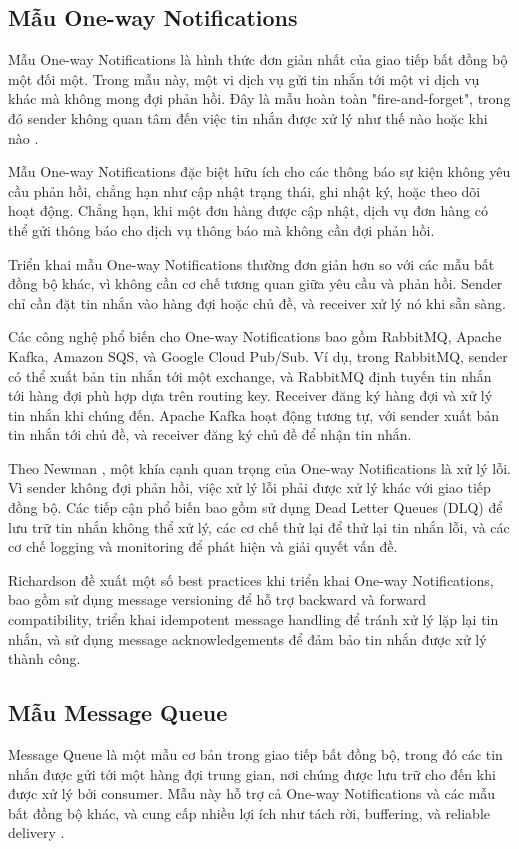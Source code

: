 \subsection{Mẫu One-way Notifications}
Mẫu One-way Notifications là hình thức đơn giản nhất của giao tiếp bất đồng bộ một đối một. Trong mẫu này, một vi dịch vụ gửi tin nhắn tới một vi dịch vụ khác mà không mong đợi phản hồi. Đây là mẫu hoàn toàn "fire-and-forget", trong đó sender không quan tâm đến việc tin nhắn được xử lý như thế nào hoặc khi nào \cite{hohpe2004}.

Mẫu One-way Notifications đặc biệt hữu ích cho các thông báo sự kiện không yêu cầu phản hồi, chẳng hạn như cập nhật trạng thái, ghi nhật ký, hoặc theo dõi hoạt động. Chẳng hạn, khi một đơn hàng được cập nhật, dịch vụ đơn hàng có thể gửi thông báo cho dịch vụ thông báo mà không cần đợi phản hồi.

Triển khai mẫu One-way Notifications thường đơn giản hơn so với các mẫu bất đồng bộ khác, vì không cần cơ chế tương quan giữa yêu cầu và phản hồi. Sender chỉ cần đặt tin nhắn vào hàng đợi hoặc chủ đề, và receiver xử lý nó khi sẵn sàng.

Các công nghệ phổ biến cho One-way Notifications bao gồm RabbitMQ, Apache Kafka, Amazon SQS, và Google Cloud Pub/Sub. Ví dụ, trong RabbitMQ, sender có thể xuất bản tin nhắn tới một exchange, và RabbitMQ định tuyến tin nhắn tới hàng đợi phù hợp dựa trên routing key. Receiver đăng ký hàng đợi và xử lý tin nhắn khi chúng đến. Apache Kafka hoạt động tương tự, với sender xuất bản tin nhắn tới chủ đề, và receiver đăng ký chủ đề để nhận tin nhắn.

Theo Newman \cite{newman2015}, một khía cạnh quan trọng của One-way Notifications là xử lý lỗi. Vì sender không đợi phản hồi, việc xử lý lỗi phải được xử lý khác với giao tiếp đồng bộ. Các tiếp cận phổ biến bao gồm sử dụng Dead Letter Queues (DLQ) để lưu trữ tin nhắn không thể xử lý, các cơ chế thử lại để thử lại tin nhắn lỗi, và các cơ chế logging và monitoring để phát hiện và giải quyết vấn đề.

Richardson \cite{richardson2019} đề xuất một số best practices khi triển khai One-way Notifications, bao gồm sử dụng message versioning để hỗ trợ backward và forward compatibility, triển khai idempotent message handling để tránh xử lý lặp lại tin nhắn, và sử dụng message acknowledgements để đảm bảo tin nhắn được xử lý thành công.

\subsection{Mẫu Message Queue}
Message Queue là một mẫu cơ bản trong giao tiếp bất đồng bộ, trong đó các tin nhắn được gửi tới một hàng đợi trung gian, nơi chúng được lưu trữ cho đến khi được xử lý bởi consumer. Mẫu này hỗ trợ cả One-way Notifications và các mẫu bất đồng bộ khác, và cung cấp nhiều lợi ích như tách rời, buffering, và reliable delivery \cite{hohpe2004}.

